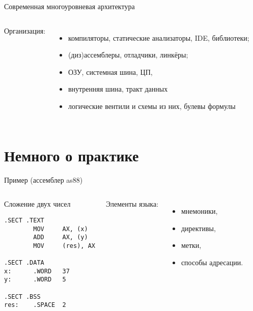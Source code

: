 \begin{frame}{Современная многоуровневая архитектура}
\begin{columns}
	\column{6cm}
	\column{6.5cm}
\pause
Организация:
\begin{itemize}[<+->]
	\item компиляторы, статические анализаторы,
			IDE, библиотеки;

	\vspace{.6cm}
	\item (диз)ассемблеры, отладчики, линкёры;

	\vspace{.6cm}
	\item ОЗУ, системная шина, ЦП,

	\vspace{.8cm}
	\item внутренняя шина, тракт данных

	\vspace{.9cm}
	\item логические вентили и схемы из них, булевы формулы
\end{itemize}
\end{columns}
\end{frame}

\section {Немного о практике}

\begin{frame}[fragile]{Пример (ассемблер as88)}
\begin{columns}
	\column{7.5cm}
\begin{block}{Сложение двух чисел}
\begin{verbatim}
.SECT .TEXT
        MOV     AX, (x)
        ADD     AX, (y)
        MOV     (res), AX

.SECT .DATA
x:      .WORD   37
y:      .WORD   5

.SECT .BSS
res:    .SPACE  2
\end{verbatim}
\end{block}
	\column{4.5cm}\pause
Элементы языка\pause:
\begin{itemize}
	\item мнемоники,
	\item директивы,
	\item метки,
	\item способы адресации.
\end{itemize}
\end{columns}
\end{frame}

